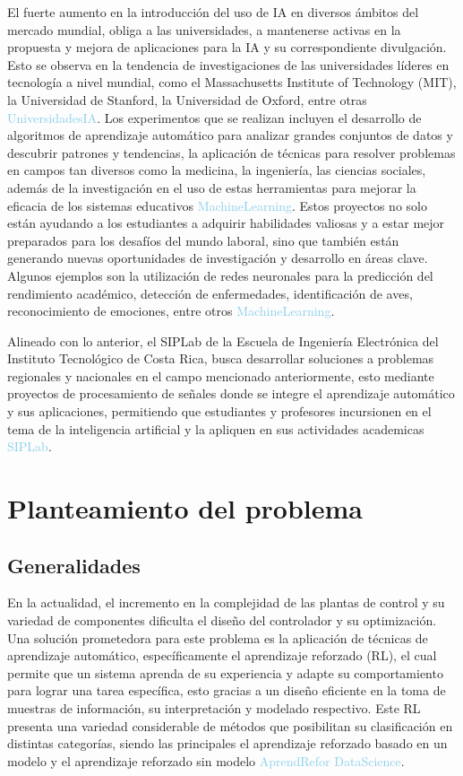 El fuerte aumento en la introducción del uso de IA en diversos ámbitos del mercado mundial, obliga a las universidades, a mantenerse activas en la propuesta y mejora de aplicaciones para la IA y su correspondiente divulgación. Esto se observa en la tendencia de investigaciones de las universidades líderes en tecnología a nivel mundial, como el Massachusetts Institute of Technology (MIT), la Universidad de Stanford, la Universidad de Oxford, entre otras \textcolor{SkyBlue}{UniversidadesIA}. Los experimentos que se realizan incluyen el desarrollo de algoritmos de aprendizaje automático para analizar grandes conjuntos de datos y descubrir patrones y tendencias, la aplicación de técnicas para resolver problemas en campos tan diversos como la medicina, la ingeniería, las ciencias sociales, además de la investigación en el uso de estas herramientas para mejorar la eficacia de los sistemas educativos \textcolor{SkyBlue}{MachineLearning}. Estos proyectos no solo están ayudando a los estudiantes a adquirir habilidades valiosas y a estar mejor preparados para los desafíos del mundo laboral, sino que también están generando nuevas oportunidades de investigación y desarrollo en áreas clave. Algunos ejemplos son la utilización de redes neuronales para la predicción del rendimiento académico, detección de enfermedades, identificación de aves, reconocimiento de emociones, entre otros \textcolor{SkyBlue}{MachineLearning}.

Alineado con lo anterior, el SIPLab de la Escuela de Ingeniería Electrónica del Instituto Tecnológico de Costa Rica, busca desarrollar soluciones a problemas regionales y nacionales en el campo mencionado anteriormente, esto mediante proyectos de procesamiento de señales donde se integre el aprendizaje automático y sus aplicaciones, permitiendo que estudiantes y profesores incursionen en el tema de la inteligencia artificial y la apliquen en sus actividades academicas \textcolor{SkyBlue}{SIPLab}. 



\section{Planteamiento del problema}

\subsection{Generalidades}

En la actualidad, el incremento en la complejidad de las plantas de control y su variedad de componentes dificulta el diseño del controlador y su optimización. Una solución prometedora para este problema es la aplicación de técnicas de aprendizaje automático, específicamente el aprendizaje reforzado (RL), el cual permite que un sistema aprenda de su experiencia y adapte su comportamiento para lograr una tarea específica, esto gracias a un diseño eficiente en la toma de muestras de información, su interpretación y modelado respectivo. Este RL presenta una variedad considerable de métodos que posibilitan su clasificación en distintas categorías, siendo las principales el aprendizaje reforzado basado en un modelo y el aprendizaje reforzado sin modelo \textcolor{SkyBlue}{AprendRefor} \textcolor{SkyBlue}{DataScience}.

